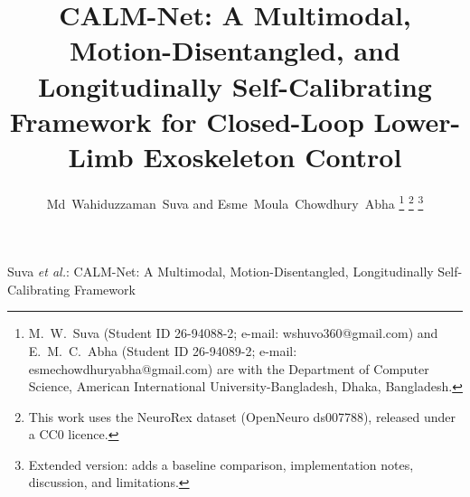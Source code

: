 \documentclass[journal]{IEEEtran}
\begin{document}
\title{CALM-Net: A Multimodal, Motion-Disentangled, and Longitudinally
Self-Calibrating Framework for Closed-Loop Lower-Limb Exoskeleton Control}

\author{Md~Wahiduzzaman~Suva and Esme~Moula~Chowdhury~Abha
\thanks{M.~W.~Suva (Student ID 26-94088-2; e-mail: \mbox{wshuvo360@gmail.com}) and
E.~M.~C.~Abha (Student ID 26-94089-2; e-mail: \mbox{esmechowdhuryabha@gmail.com}) are
with the Department of Computer Science, American International University-Bangladesh,
Dhaka, Bangladesh.}
\thanks{This work uses the NeuroRex dataset (OpenNeuro ds007788), released under
a CC0 licence.}
\thanks{Extended version: adds a baseline comparison, implementation notes, discussion, and limitations.}}

%
{Suva \MakeLowercase{\textit{et al.}}: CALM-Net: A Multimodal, Motion-Disentangled, Longitudinally Self-Calibrating Framework}
\maketitle
\end{document}
